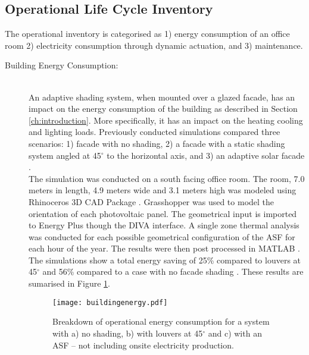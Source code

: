 \subsection{Operational Life Cycle Inventory}
\label{ch:Meth:Opp}

The operational inventory is categorised as 1) energy consumption of an office room 2) electricity consumption through dynamic actuation, and 3) maintenance.

\begin{description}


\item[Building Energy Consumption: ] \hfill\\
An adaptive shading system, when mounted over a glazed facade, has an impact on the energy consumption of the building as described in Section \ref{ch:introduction}. More specifically, it has an impact on the heating cooling and lighting loads. Previously conducted simulations compared three scenarios: 1) facade with no shading, 2) a facade with a static shading system angled at 45$^{\circ}$ to the horizontal axis, and 3) an adaptive solar facade \cite{jayathissa2015abs}.\\

The simulation was conducted on a south facing office room. The room, 7.0 meters in length, 4.9 meters wide and 3.1 meters high was modeled using Rhinoceros 3D CAD Package \cite{Rhino}. Grasshopper \cite{grasshopper} was used to model the orientation of each photovoltaic panel. The geometrical input is imported to Energy Plus \cite{energyplus} though the DIVA \cite{DIVA} interface. A single zone thermal analysis was conducted for each possible geometrical configuration of the ASF for each hour of the year. The results were then post processed in MATLAB \cite{MATLAB}.\\

The simulations show a total energy saving of 25\% compared to louvers at 45$^\circ$ and 56\% compared to a case with no facade shading \cite{jayathissa2015abs}. These results are sumarised in Figure \ref{fig:operational}. \\


\begin{figure}[H]
\begin{center}
\texttt{[image: buildingenergy.pdf]}
\caption{Breakdown of operational energy consumption for a system with a) no shading, b) with louvers at 45$^\circ$ and c) with an ASF -- not including onsite electricity production.}
\label{fig:operational}
\end{center}
\end{figure}


\end{description}
